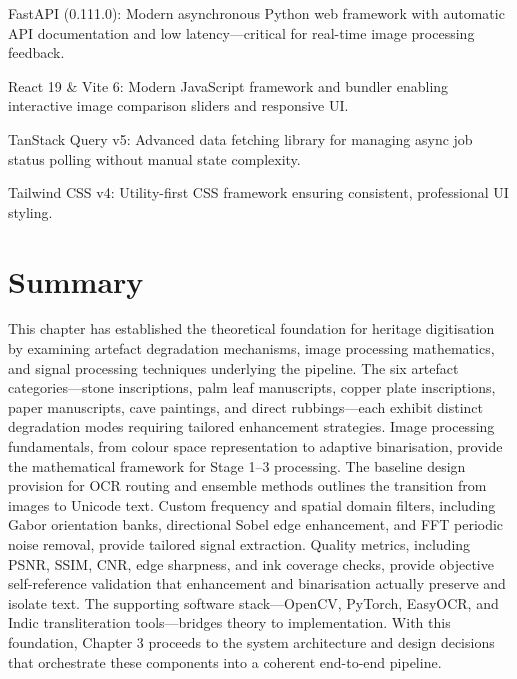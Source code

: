 FastAPI (0.111.0): Modern asynchronous Python web framework with automatic API documentation and low latency—critical for real-time image processing feedback.

React 19 \& Vite 6: Modern JavaScript framework and bundler enabling interactive image comparison sliders and responsive UI.

TanStack Query v5: Advanced data fetching library for managing async job status polling without manual state complexity.

Tailwind CSS v4: Utility-first CSS framework ensuring consistent, professional UI styling.

\section{Summary}

This chapter has established the theoretical foundation for heritage digitisation by examining artefact degradation mechanisms, image processing mathematics, and signal processing techniques underlying the pipeline. The six artefact categories—stone inscriptions, palm leaf manuscripts, copper plate inscriptions, paper manuscripts, cave paintings, and direct rubbings—each exhibit distinct degradation modes requiring tailored enhancement strategies. Image processing fundamentals, from colour space representation to adaptive binarisation, provide the mathematical framework for Stage 1–3 processing. The baseline design provision for OCR routing and ensemble methods outlines the transition from images to Unicode text. Custom frequency and spatial domain filters, including Gabor orientation banks, directional Sobel edge enhancement, and FFT periodic noise removal, provide tailored signal extraction. Quality metrics, including PSNR, SSIM, CNR, edge sharpness, and ink coverage checks, provide objective self-reference validation that enhancement and binarisation actually preserve and isolate text. The supporting software stack—OpenCV, PyTorch, EasyOCR, and Indic transliteration tools—bridges theory to implementation. With this foundation, Chapter 3 proceeds to the system architecture and design decisions that orchestrate these components into a coherent end-to-end pipeline.

